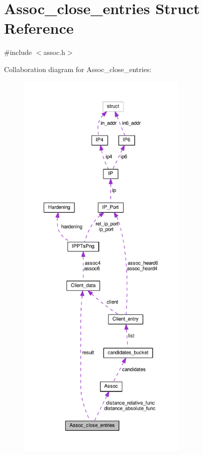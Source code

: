 \hypertarget{struct_assoc__close__entries}{\section{Assoc\+\_\+close\+\_\+entries Struct Reference}
\label{struct_assoc__close__entries}
}


{\ttfamily \#include $<$assoc.\+h$>$}



Collaboration diagram for Assoc\+\_\+close\+\_\+entries\+:
\nopagebreak
\begin{figure}[H]
\begin{center}
\leavevmode
\includegraphics[height=550pt]{d5/db9/struct_assoc__close__entries__coll__graph}
\end{center}
\end{figure}

